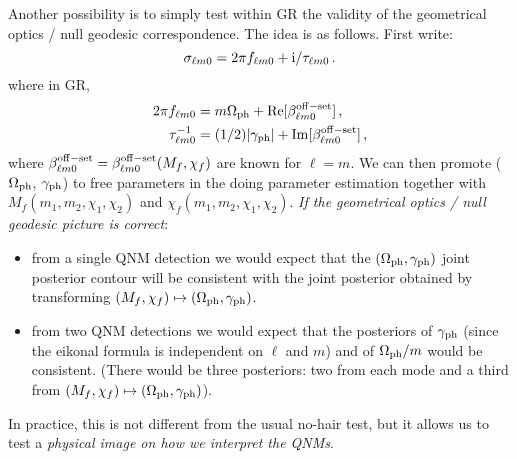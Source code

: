 \documentclass[aps,prd,10pt,preprint,
               notitlepage,onecolumn,superscriptaddress,
               eqsecnum,
               nofootinbib,tightenlines,floatfix]{revtex4-2}
\newcommand{\ii}{{\rm i}}
\begin{document}
Another possibility is to simply test within GR the validity of the geometrical optics / null
geodesic correspondence. The idea is as follows. First write:
%
\begin{equation}
    \sigma_{\ell m 0} = 2 \pi f_{\ell m 0} + \ii / \tau_{\ell m 0}\,.
\end{equation}
%
where in GR,
%
\begin{subequations}
\begin{align}
    2 \pi f_{\ell m 0} &= m \Omega_{\rm ph} + {\rm  Re}[\beta^{\rm off-set}_{\ell m 0}]\,,
    \\
    \tau^{-1}_{\ell m 0} &= (1/2) |\gamma_{\rm ph}|+ {\rm  Im}[\beta^{\rm off-set}_{\ell m 0}]\,,
\label{eq:re_im_eikonal}
\end{align}
\end{subequations}
%
where $\beta^{\rm off-set}_{\ell m 0} = \beta^{\rm off-set}_{\ell m 0}(M_f, \chi_f)$ are known for $\ell = m $.
%
We can then promote ($\Omega_{\rm ph}$, $\gamma_{\rm ph}$) to free parameters in the
doing parameter estimation together with $M_f(m_1, m_2, \chi_1, \chi_2)$ and $\chi_f(m_1, m_2, \chi_1, \chi_2)$.
%
\emph{If the geometrical optics / null geodesic picture is correct}:
%
\begin{itemize}
    \item from a single QNM detection we would expect that the $(\Omega_{\rm ph}, \gamma_{\rm ph})$ joint posterior contour will be consistent
    with the joint posterior obtained by transforming $(M_f, \chi_f) \mapsto (\Omega_{\rm ph}, \gamma_{\rm ph})$.
    \item from two QNM detections we would expect that the posteriors of $\gamma_{\rm ph}$ (since
    the eikonal formula is independent on $\ell$ and $m$) and of $\Omega_{\rm ph} / m$ would be consistent. (There would be three posteriors: two from each mode
    and a third from $(M_f, \chi_f) \mapsto (\Omega_{\rm ph}, \gamma_{\rm ph})$).
\end{itemize}

In practice, this is not different from the usual no-hair test, but it allows us to test a \emph{physical image
on how we interpret the QNMs}.
\end{document}

